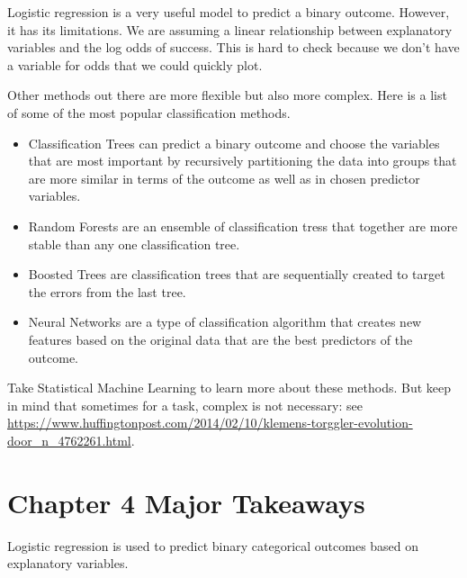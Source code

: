 \documentclass[
]{book}
\begin{document}
Logistic regression is a very useful model to predict a binary outcome. However, it has its limitations. We are assuming a linear relationship between explanatory variables and the log odds of success. This is hard to check because we don't have a variable for odds that we could quickly plot.

Other methods out there are more flexible but also more complex. Here is a list of some of the most popular classification methods.

\begin{itemize}
\item
  Classification Trees can predict a binary outcome and choose the variables that are most important by recursively partitioning the data into groups that are more similar in terms of the outcome as well as in chosen predictor variables.
\item
  Random Forests are an ensemble of classification tress that together are more stable than any one classification tree.
\item
  Boosted Trees are classification trees that are sequentially created to target the errors from the last tree.
\item
  Neural Networks are a type of classification algorithm that creates new features based on the original data that are the best predictors of the outcome.
\end{itemize}

Take Statistical Machine Learning to learn more about these methods. But keep in mind that sometimes for a task, complex is not necessary: see \url{https://www.huffingtonpost.com/2014/02/10/klemens-torggler-evolution-door_n_4762261.html}.

\section{Chapter 4 Major Takeaways}\label{chapter-4-major-takeaways}

Logistic regression is used to predict binary categorical outcomes based on explanatory variables.
\end{document}
